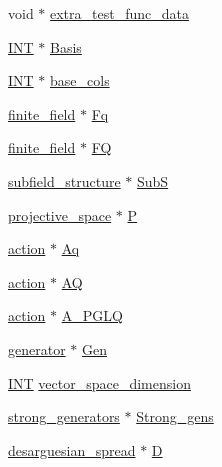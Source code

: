 \begin{DoxyCompactItemize}
\item 
void $\ast$ \mbox{\hyperlink{classlinear__set_a840d0c6f1c5d0c1298b2357a1d8891ee}{extra\+\_\+test\+\_\+func\+\_\+data}}
\item 
\mbox{\hyperlink{galois_8h_a09fddde158a3a20bd2dcadb609de11dc}{I\+NT}} $\ast$ \mbox{\hyperlink{classlinear__set_acb64f3ceed3c1f90547d2d9b9faf296a}{Basis}}
\item 
\mbox{\hyperlink{galois_8h_a09fddde158a3a20bd2dcadb609de11dc}{I\+NT}} $\ast$ \mbox{\hyperlink{classlinear__set_a3b8374a856cf84a2107e12225f6f66e1}{base\+\_\+cols}}
\item 
\mbox{\hyperlink{classfinite__field}{finite\+\_\+field}} $\ast$ \mbox{\hyperlink{classlinear__set_a9b5751ae10a4a157d0becf196b49c0a4}{Fq}}
\item 
\mbox{\hyperlink{classfinite__field}{finite\+\_\+field}} $\ast$ \mbox{\hyperlink{classlinear__set_ad82a9478975d63ca4ff78040e90155b3}{FQ}}
\item 
\mbox{\hyperlink{classsubfield__structure}{subfield\+\_\+structure}} $\ast$ \mbox{\hyperlink{classlinear__set_a15959d1f392d41cfa75598f6a7b59138}{SubS}}
\item 
\mbox{\hyperlink{classprojective__space}{projective\+\_\+space}} $\ast$ \mbox{\hyperlink{classlinear__set_a1de6f5ab3d701bd729c2da95f630884c}{P}}
\item 
\mbox{\hyperlink{classaction}{action}} $\ast$ \mbox{\hyperlink{classlinear__set_a9e1bda536d3fb024797963ab430f0e03}{Aq}}
\item 
\mbox{\hyperlink{classaction}{action}} $\ast$ \mbox{\hyperlink{classlinear__set_a5541da1a38b3686265c2765181d353d9}{AQ}}
\item 
\mbox{\hyperlink{classaction}{action}} $\ast$ \mbox{\hyperlink{classlinear__set_a5cb29e2f816926ef4adc82a7467e83f6}{A\+\_\+\+P\+G\+LQ}}
\item 
\mbox{\hyperlink{classgenerator}{generator}} $\ast$ \mbox{\hyperlink{classlinear__set_a2ad6a4dd287d060b4f7a8af6284e2981}{Gen}}
\item 
\mbox{\hyperlink{galois_8h_a09fddde158a3a20bd2dcadb609de11dc}{I\+NT}} \mbox{\hyperlink{classlinear__set_a7acca31596dc61569c344fb076208163}{vector\+\_\+space\+\_\+dimension}}
\item 
\mbox{\hyperlink{classstrong__generators}{strong\+\_\+generators}} $\ast$ \mbox{\hyperlink{classlinear__set_a491c1c868fecc7b963db5abc483f6a9f}{Strong\+\_\+gens}}
\item 
\mbox{\hyperlink{classdesarguesian__spread}{desarguesian\+\_\+spread}} $\ast$ \mbox{\hyperlink{classlinear__set_a9e4a5f3a65265d55e9062d14edaa2ca6}{D}}

\end{DoxyCompactItemize}
